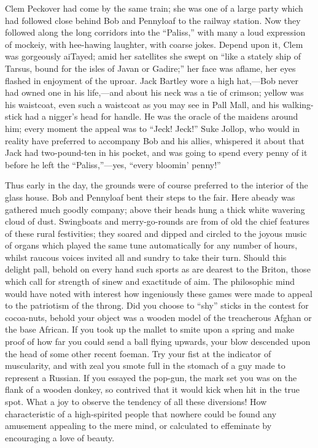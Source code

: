 Clem Peckover had come by the same train; she was one of a large party
which had followed close behind Bob and Pennyloaf to the railway
station. Now they followed along the long corridors into the ``Paliss,''
with many a loud expression of mockeiy, with hee-hawing laughter, with
coarse jokes. Depend upon it, Clem was gorgeously aiTayed; amid her
satellites she swept on ``like a stately ship of Tarsus, bound for the
isles of Javan or Gadire;'' her face was aflame, her eyes flashed in
enjoyment of the {\protect\hypertarget{258}{}{}}uproar. Jack Bartley
wore a high hat,---Bob never had owned one in his life,---and about his
neck was a tie of crimson; yellow was his waistcoat, even such a
waistcoat as you may see in Pall Mall, and his walking-stick had a
nigger's head for handle. He was the oracle of the maidens around him;
every moment the appeal was to ``Jeck! Jeck!'' Suke Jollop, who would in
reality have preferred to accompany Bob and his allies, whispered it
about that Jack had two-pound-ten in his pocket, and was going to spend
every penny of it before he left the ``Paliss,''---yes, ``every bloomin'
penny!''

Thus early in the day, the grounds were of course preferred to the
interior of the glass house. Bob and Pennyloaf bent their steps to the
fair. Here abeady was gathered much goodly company; above their heads
hung a thick white wavering cloud of dust. Swingboats and
merry-go-rounds are from of old the chief features of these rural
festivities; they soared and dipped and circled to the joyous music of
organs which played the {\protect\hypertarget{259}{}{}}same tune
automatically for any number of hours, whilst raucous voices invited all
and sundry to take their turn. Should this delight pall, behold on every
hand such sports as are dearest to the Briton, those which call for
strength of sinew and exactitude of aim. The philosophic mind would have
noted with interest how ingeniously these games were made to appeal to
the patriotism of the throng. Did you choose to ``shy'' sticks in the
contest for cocoa-nuts, behold your object was a wooden model of the
treacherous Afghan or the base African. If you took up the mallet to
smite upon a spring and make proof of how far you could send a ball
flying upwards, your blow descended upon the head of some other recent
foeman. Try your fist at the indicator of muscularity, and with zeal you
smote full in the stomach of a guy made to represent a Russian. If you
essayed the pop-gun, the mark set you was on the flank of a wooden
donkey, so contrived that it would kick when hit in the true spot. What
a joy to observe the {\protect\hypertarget{260}{}{}}tendency of all
these diversions! How characteristic of a high-spirited people that
nowhere could be found any amusement appealing to the mere mind, or
calculated to effeminate by encouraging a love of beauty.

